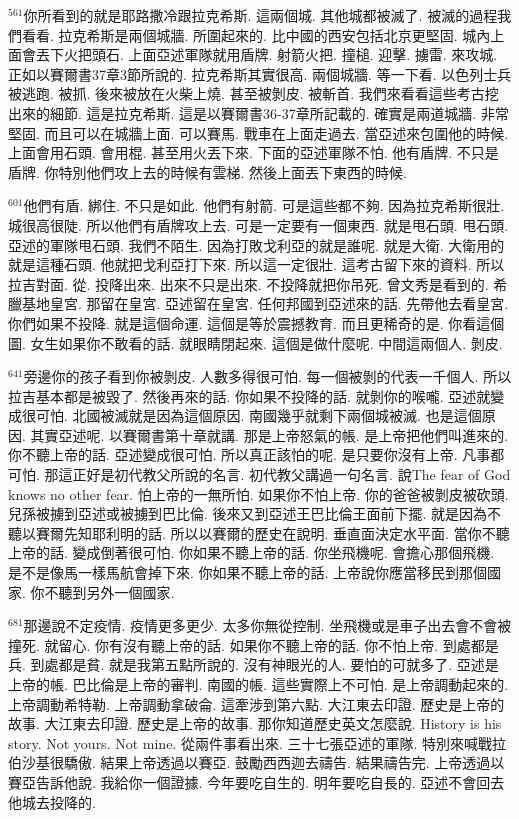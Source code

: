 \documentclass{book}
\begin{document}
$^{561}$你所看到的就是耶路撒冷跟拉克希斯.
這兩個城.
其他城都被滅了.
被滅的過程我們看看.
拉克希斯是兩個城牆.
所圍起來的.
比中國的西安包括北京更堅固.
城內上面會丟下火把頭石.
上面亞述軍隊就用盾牌.
射箭火把.
撞槌.
迎擊.
擄雷.
來攻城.
正如以賽爾書37章3節所說的.
拉克希斯其實很高.
兩個城牆.
等一下看.
以色列士兵被逃跑.
被抓.
後來被放在火柴上燒.
甚至被剝皮.
被斬首.
我們來看看這些考古挖出來的細節.
這是拉克希斯.
這是以賽爾書36-37章所記載的.
確實是兩道城牆.
非常堅固.
而且可以在城牆上面.
可以賽馬.
戰車在上面走過去.
當亞述來包圍他的時候.
上面會用石頭.
會用棍.
甚至用火丟下來.
下面的亞述軍隊不怕.
他有盾牌.
不只是盾牌.
你特別他們攻上去的時候有雲梯.
然後上面丟下東西的時候.

$^{601}$他們有盾.
綁住.
不只是如此.
他們有射箭.
可是這些都不夠.
因為拉克希斯很壯.
城很高很陡.
所以他們有盾牌攻上去.
可是一定要有一個東西.
就是甩石頭.
甩石頭.
亞述的軍隊甩石頭.
我們不陌生.
因為打敗戈利亞的就是誰呢.
就是大衛.
大衛用的就是這種石頭.
他就把戈利亞打下來.
所以這一定很壯.
這考古留下來的資料.
所以拉吉對面.
從.
投降出來.
出來不只是出來.
不投降就把你吊死.
曾文秀是看到的.
希臘基地皇宮.
那留在皇宮.
亞述留在皇宮.
任何邦國到亞述來的話.
先帶他去看皇宮.
你們如果不投降.
就是這個命運.
這個是等於震撼教育.
而且更稀奇的是.
你看這個圖.
女生如果你不敢看的話.
就眼睛閉起來.
這個是做什麼呢.
中間這兩個人.
剝皮.

$^{641}$旁邊你的孩子看到你被剝皮.
人數多得很可怕.
每一個被剝的代表一千個人.
所以拉吉基本都是被毀了.
然後再來的話.
你如果不投降的話.
就剝你的喉嚨.
亞述就變成很可怕.
北國被滅就是因為這個原因.
南國幾乎就剩下兩個城被滅.
也是這個原因.
其實亞述呢.
以賽爾書第十章就講.
那是上帝怒氣的帳.
是上帝把他們叫進來的.
你不聽上帝的話.
亞述變成很可怕.
所以真正該怕的呢.
是只要你沒有上帝.
凡事都可怕.
那這正好是初代教父所說的名言.
初代教父講過一句名言.
說The fear of God knows no other fear.
怕上帝的一無所怕.
如果你不怕上帝.
你的爸爸被剝皮被砍頭.
兒孫被擄到亞述或被擄到巴比倫.
後來又到亞述王巴比倫王面前下擺.
就是因為不聽以賽爾先知耶利明的話.
所以以賽爾的歷史在說明.
垂直面決定水平面.
當你不聽上帝的話.
變成倒著很可怕.
你如果不聽上帝的話.
你坐飛機呢.
會擔心那個飛機.
是不是像馬一樣馬航會掉下來.
你如果不聽上帝的話.
上帝說你應當移民到那個國家.
你不聽到另外一個國家.

$^{681}$那邊說不定疫情.
疫情更多更少.
太多你無從控制.
坐飛機或是車子出去會不會被撞死.
就留心.
你有沒有聽上帝的話.
如果你不聽上帝的話.
你不怕上帝.
到處都是兵.
到處都是貧.
就是我第五點所說的.
沒有神眼光的人.
要怕的可就多了.
亞述是上帝的帳.
巴比倫是上帝的審判.
南國的帳.
這些實際上不可怕.
是上帝調動起來的.
上帝調動希特勒.
上帝調動拿破侖.
這牽涉到第六點.
大江東去印證.
歷史是上帝的故事.
大江東去印證.
歷史是上帝的故事.
那你知道歷史英文怎麼說.
History is his story.
Not yours.
Not mine.
從兩件事看出來.
三十七張亞述的軍隊.
特別來喊戰拉伯沙基很驕傲.
結果上帝透過以賽亞.
鼓勵西西迦去禱告.
結果禱告完.
上帝透過以賽亞告訴他說.
我給你一個證據.
今年要吃自生的.
明年要吃自長的.
亞述不會回去他城去投降的.
\end{document}
